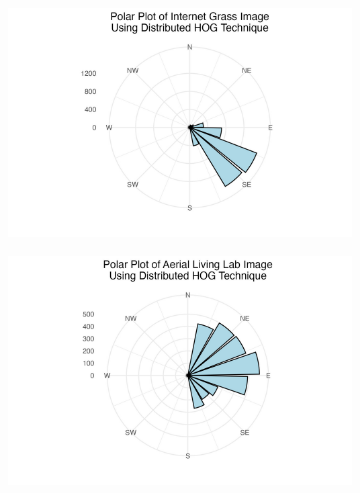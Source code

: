 \documentclass[
  letterpaper,
  DIV=11,
  numbers=noendperiod]{scrreprt}
\begin{document}
\begin{figure}

\begin{minipage}{0.33\linewidth}

\begin{figure}[H]

{\centering \includegraphics{images/plots/grass/internet_grass_contribution_polar_plot.jpg}

}


\end{figure}%

\end{minipage}%
%
\begin{minipage}{0.33\linewidth}

\begin{figure}[H]

{\centering \includegraphics{images/plots/grass/aerial_living_lab_contribution_polar_plot.jpg}

}
\end{figure}
\end{minipage}
\end{figure}
\end{document}
